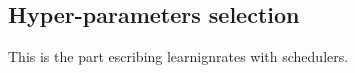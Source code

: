 \subsection{Hyper-parameters selection} \label{subsec:l-rate}
This is the part escribing learnignrates with schedulers.
